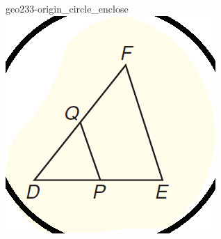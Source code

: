 \documentclass[12pt]{article}
\begin{document}
\begin{center}
\begin{minipage}{0.32\textwidth}
\end{minipage}
\hfill\begin{minipage}{0.32\textwidth}\centering
geo233-origin\_circle\_enclose\\
\includegraphics[width=0.95\linewidth]{out_rommath_origin/items/geo233-origin/assets/figure_circle.png}
\end{minipage}
\par
\end{center}
\bigskip
\end{document}
